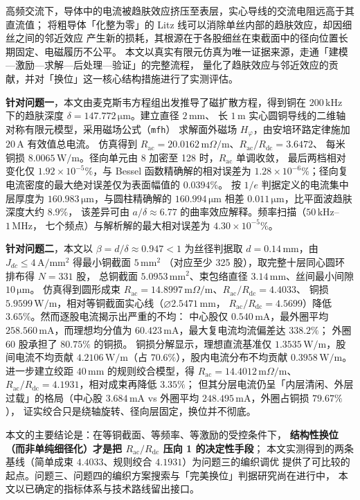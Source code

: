 \documentclass[12pt, a4paper]{ctexart}
\newcommand{\Rac}{R_{\mathrm{ac}}}
\newcommand{\Rdc}{R_{\mathrm{dc}}}
\newcommand{\U}[1]{\ensuremath{\,\mathrm{#1}}}
\newcommand{\Uohm}{\ensuremath{\,\mathrm{m}\Omega/\mathrm{m}}}%
\begin{document}
高频交流下，导体中的电流被趋肤效应挤压至表层，实心导线的交流电阻远高于其直流值；
将粗导体「化整为零」的 Litz 线可以消除单丝内部的趋肤效应，却因细丝之间的邻近效应
产生新的损耗，其根源在于各股细丝在束截面中的径向位置长期固定、电磁履历不公平。
本文以真实有限元仿真为唯一证据来源，走通「建模—激励—求解—后处理—验证」的完整流程，
量化了趋肤效应与邻近效应的贡献，并对「换位」这一核心结构措施进行了实测评估。

\textbf{针对问题一}，本文由麦克斯韦方程组出发推导了磁扩散方程，得到铜在
$200\U{kHz}$ 下的趋肤深度 $\delta = 147.772\U{\mu m}$。建立直径 $2\U{mm}$、
长 $1\U{m}$ 实心圆铜导线的二维轴对称有限元模型，采用磁场公式（\texttt{mfh}）
求解面外磁场 $H_\varphi$，由安培环路定律施加 $20\U{A}$ 有效值总电流。
仿真得到 $\Rac = 20.0162\Uohm$、$\Rac/\Rdc = 3.6472$、
每米铜损 $8.0065\U{W/m}$。径向单元由 8 加密至 128 时，$\Rac$ 单调收敛，
最后两档相对变化仅 $1.92\times10^{-5}\%$，与 Bessel 函数精确解的相对误差为
$1.28\times10^{-6}\%$；径向复电流密度的最大绝对误差仅为表面幅值的 $0.0394\%$。
按 $1/e$ 判据定义的电流集中层厚度为 $160.983\U{\mu m}$，与圆柱精确解的
$160.994\U{\mu m}$ 相差 $0.011\U{\mu m}$，比平面波趋肤深度大约 $8.9\%$，
该差异可由 $a/\delta \approx 6.77$ 的曲率效应解释。频率扫描（$50\U{kHz}$--$1\U{MHz}$，
七个频点）与解析解的最大相对误差为 $4.30\times10^{-5}\%$。

\textbf{针对问题二}，本文以 $\beta = d/\delta \approx 0.947 < 1$ 为丝径判据取
$d = 0.14\U{mm}$，由 $J_{dc}\le 4\U{A/mm^2}$ 得最小铜截面 $5\U{mm^2}$
（对应至少 325 股），取完整十层同心圆环排布得 $N = 331$ 股，
总铜截面 $5.0953\U{mm^2}$、束包络直径 $3.14\U{mm}$、丝间最小间隙 $10\U{\mu m}$。
仿真得到圆形成束 $\Rac = 14.8997\Uohm$、$\Rac/\Rdc = 4.4033$、
铜损 $5.9599\U{W/m}$，相对等铜截面实心线（$\varnothing 2.5471\U{mm}$，
$\Rac/\Rdc = 4.5699$）降低 $3.65\%$。然而逐股电流揭示出严重的不均：
中心股仅 $0.540\U{mA}$，最外圈平均 $258.560\U{mA}$，而理想均分值为
$60.423\U{mA}$，最大复电流均流偏差达 $338.2\%$；
外圈 60 股承担了 $80.75\%$ 的铜损。
铜损分解显示，理想直流基准仅 $1.3535\U{W/m}$，股间电流不均贡献
$4.2106\U{W/m}$（占 $70.6\%$），股内电流分布不均贡献 $0.3958\U{W/m}$。
进一步建立绞距 $40\U{mm}$ 的规则绞合模型，得 $\Rac = 14.4012\Uohm$、
$\Rac/\Rdc = 4.1931$，相对成束再降低 $3.35\%$；
但其分层电流仍呈「内层清闲、外层过载」的格局（中心股 $3.684\U{mA}$ vs
外圈平均 $248.495\U{mA}$，外圈占铜损 $79.67\%$），
证实绞合只是绕轴旋转、径向层固定，换位并不彻底。

本文的主要结论是：在等铜截面、等频率、等激励的受控条件下，
\textbf{结构性换位（而非单纯细径化）才是把 $\Rac/\Rdc$ 压向 1 的决定性手段}；
本文实测得到的两条基线（简单成束 $4.4033$、规则绞合 $4.1931$）为问题三的编织调优
提供了可比较的起点。问题三、问题四的编织方案搜索与「完美换位」判据研究尚在进行中，
本文以已确定的指标体系与技术路线留出接口。
\end{document}
